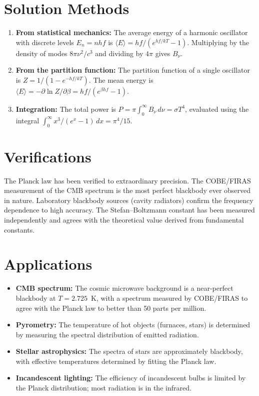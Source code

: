 \section*{Solution Methods}

\begin{enumerate}
  \item \textbf{From statistical mechanics:} The average energy of a harmonic oscillator with discrete levels $E_{n} = nhf$ is $\langle E\rangle = hf/(e^{hf/kT} - 1)$. Multiplying by the density of modes $8\pi\nu^{2}/c^{3}$ and dividing by $4\pi$ gives $B_{\nu}$.
  \item \textbf{From the partition function:} The partition function of a single oscillator is $Z = 1/(1 - e^{-hf/kT})$. The mean energy is $\langle E\rangle = -\partial\ln Z/\partial\beta = hf/(e^{\beta hf} - 1)$.
  \item \textbf{Integration:} The total power is $P = \pi\int_{0}^{\infty} B_{\nu}\,d\nu = \sigma T^{4}$, evaluated using the integral $\int_{0}^{\infty} x^{3}/(e^{x}-1)\,dx = \pi^{4}/15$.
\end{enumerate}
\section*{Verifications}

The Planck law has been verified to extraordinary precision. The COBE/FIRAS measurement of the CMB spectrum is the most perfect blackbody ever observed in nature. Laboratory blackbody sources (cavity radiators) confirm the frequency dependence to high accuracy. The Stefan--Boltzmann constant has been measured independently and agrees with the theoretical value derived from fundamental constants.
\section*{Applications}

\begin{itemize}
  \item \textbf{CMB spectrum:} The cosmic microwave background is a near-perfect blackbody at $T = 2.725$~K, with a spectrum measured by COBE/FIRAS to agree with the Planck law to better than 50 parts per million.
  \item \textbf{Pyrometry:} The temperature of hot objects (furnaces, stars) is determined by measuring the spectral distribution of emitted radiation.
  \item \textbf{Stellar astrophysics:} The spectra of stars are approximately blackbody, with effective temperatures determined by fitting the Planck law.
  \item \textbf{Incandescent lighting:} The efficiency of incandescent bulbs is limited by the Planck distribution; most radiation is in the infrared.
\end{itemize}
